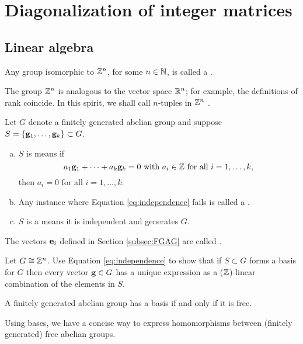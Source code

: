 \documentclass[../algebraNotesMSRI-UP2016.tex]{subfiles}
\begin{document}
\section[\S \thesection]{Diagonalization of integer matrices}\label{sec:2p9diagonalizationOfIntegerMatrices}
\subsection[\subsecname]{Linear algebra}
\begin{frame}{\subsecname}
\begin{dfn}
Any group isomorphic to $\mathbb Z^n$, for some $n\in\mathbb N$, is called a .
\end{dfn}

\smallGap
The group $\mathbb Z^n$ is analogous to the vector space $\mathbb R^n$; for example, the definitions of rank coincide.  In this spirit, we shall call $n$-tuples in $\mathbb Z^n$ .
\end{frame}

\begin{frame}{}{}
\begin{dfn}%
Let $G$ denote a finitely generated abelian group and suppose $S=\{\mathbf g_1,\dots,\mathbf g_k\}\subset G$.
\begin{enumerate}[(a)]
\item $S$ is  means if  
\begin{equation}\label{eq:independence}
a_1\mathbf g_1+\cdots+a_k\mathbf g_k=0\text{ with $a_i\in \mathbb Z$ for all $i=1,\dots,k$},
\end{equation}
then $a_i=0$ for all $i=1,\dots, k$.  
\item Any instance where Equation \eqref{eq:independence} fails is called a .
\item $S$ is a  means it is independent and generates $G$.
\end{enumerate}
\end{dfn}

\smallGap
The vectors $\mathbf e_i$ defined in Section \ref{subsec:FGAG} are called .  
\end{frame}

\begin{frame}
\begin{exe}\label{exe:uniqueSum}
Let $G\cong \mathbb Z^n$.  Use Equation \eqref{eq:independence} to show that if $S\subset G$ forms a basis for $G$ then every vector $\mathbf g\in G$ has a unique expression as a ($\mathbb Z$)-linear combination of the elements in $S$. %
\end{exe}

\smallGap
A finitely generated abelian group has a basis if and only if it is free. %

\smallGap
Using bases, we have a concise way to express homomorphisms between (finitely generated) free abelian groups. 
\end{frame}
\end{document}
